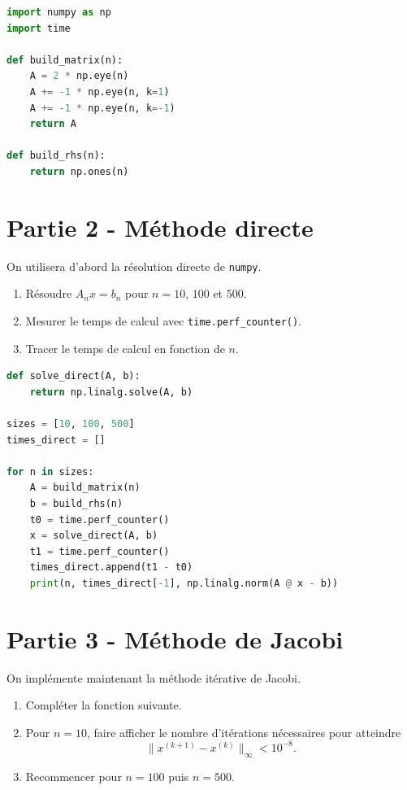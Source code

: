 \begin{lstlisting}[language=Python]
import numpy as np
import time

def build_matrix(n):
    A = 2 * np.eye(n)
    A += -1 * np.eye(n, k=1)
    A += -1 * np.eye(n, k=-1)
    return A

def build_rhs(n):
    return np.ones(n)
\end{lstlisting}

\section*{Partie 2 - Méthode directe}
On utilisera d'abord la résolution directe de \texttt{numpy}.

\begin{enumerate}
    \item Résoudre $A_nx=b_n$ pour $n=10$, $100$ et $500$.

    \item Mesurer le temps de calcul avec \texttt{time.perf\_counter()}.

    \item Tracer le temps de calcul en fonction de $n$.
\end{enumerate}

\begin{lstlisting}[language=Python]
def solve_direct(A, b):
    return np.linalg.solve(A, b)

sizes = [10, 100, 500]
times_direct = []

for n in sizes:
    A = build_matrix(n)
    b = build_rhs(n)
    t0 = time.perf_counter()
    x = solve_direct(A, b)
    t1 = time.perf_counter()
    times_direct.append(t1 - t0)
    print(n, times_direct[-1], np.linalg.norm(A @ x - b))
\end{lstlisting}

\section*{Partie 3 - Méthode de Jacobi}
On implémente maintenant la méthode itérative de Jacobi.

\begin{enumerate}
    \item Compléter la fonction suivante.

    \item Pour $n=10$, faire afficher le nombre d'itérations nécessaires pour atteindre
    \[
    \|x^{(k+1)}-x^{(k)}\|_{\infty} < 10^{-8}.
    \]

    \item Recommencer pour $n=100$ puis $n=500$.
\end{enumerate}

